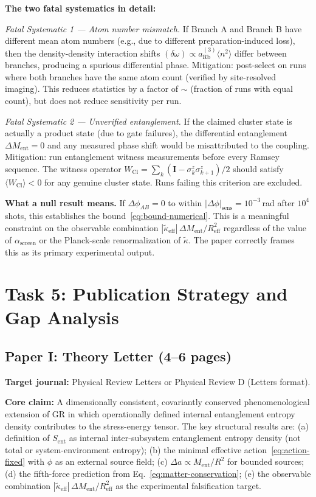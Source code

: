 \documentclass[12pt,letterpaper]{article}
\theoremstyle{plain}
\theoremstyle{definition}
\theoremstyle{remark}
\newcommand{\kt}{\tilde{\kappa}}
\newcommand{\kteff}{\tilde{\kappa}_{\mathrm{eff}}}
\newcommand{\Sent}{S_{\mathrm{ent}}}
\newcommand{\Ment}{M_{\mathrm{ent}}}
\newcommand{\asc}{\alpha_{\mathrm{screen}}}
\begin{document}
\textbf{The two fatal systematics in detail:}

\textit{Fatal Systematic 1 --- Atom number mismatch.} If Branch A and Branch B have different mean atom numbers (e.g., due to different preparation-induced loss), then the density-density interaction shifts $(\delta\omega) \propto a^{(3)}_{\mathrm{Rb}}\langle n^2\rangle$ differ between branches, producing a spurious differential phase. Mitigation: post-select on runs where both branches have the same atom count (verified by site-resolved imaging). This reduces statistics by a factor of $\sim$ (fraction of runs with equal count), but does not reduce sensitivity per run.

\textit{Fatal Systematic 2 --- Unverified entanglement.} If the claimed cluster state is actually a product state (due to gate failures), the differential entanglement $\Delta\Ment = 0$ and any measured phase shift would be misattributed to the coupling. Mitigation: run entanglement witness measurements before every Ramsey sequence. The witness operator $W_{\mathrm{Cl}} = \sum_k (\mathbf{I} - \sigma^z_k\sigma^z_{k+1})/2$ should satisfy $\langle W_{\mathrm{Cl}}\rangle < 0$ for any genuine cluster state. Runs failing this criterion are excluded.

\textbf{What a null result means.} If $\Delta\phi_{AB} = 0$ to within $|\Delta\phi|_{\mathrm{sens}} = 10^{-3}$\,rad after $10^4$ shots, this establishes the bound~\eqref{eq:bound-numerical}. This is a meaningful constraint on the observable combination $|\kteff|\,\Delta\Ment/R_{\mathrm{eff}}^2$ regardless of the value of $\asc$ or the Planck-scale renormalization of $\kt$. The paper correctly frames this as its primary experimental output.

\section{Task 5: Publication Strategy and Gap Analysis}
\label{sec:task5}

\subsection{Paper I: Theory Letter (4--6 pages)}

\textbf{Target journal:} Physical Review Letters or Physical Review D (Letters format).

\textbf{Core claim:} A dimensionally consistent, covariantly conserved phenomenological extension of GR in which operationally defined internal entanglement entropy density contributes to the stress-energy tensor. The key structural results are: (a) definition of $\Sent$ as internal inter-subsystem entanglement entropy density (not total or system-environment entropy); (b) the minimal effective action~\eqref{eq:action-fixed} with $\phi$ as an external source field; (c) $\Delta a \propto \Ment/R^2$ for bounded sources; (d) the fifth-force prediction from Eq.~\eqref{eq:matter-conservation}; (e) the observable combination $|\kteff|\,\Delta\Ment/R_{\mathrm{eff}}^2$ as the experimental falsification target.
\end{document}
